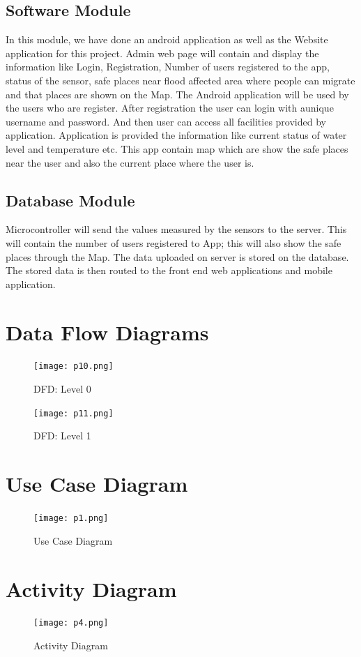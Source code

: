 \documentclass[a4paper,12pt]{report}
\begin{document}
\subsection{Software Module}
 In this module, we have done an android application as well as the Website application for this project. Admin web page will contain and display the information like Login, Registration, Number of users registered to the app, status of the sensor, safe places near flood affected area where people can migrate and that places are shown on the Map. The Android application will be used by the users who are register. After registration the user can login with aunique username and password. And then user can access all facilities provided by application. Application is provided the information like current status of water level and temperature etc. This app contain map which are show the safe places near the user and also the current place where the user is. 
\subsection{Database Module}
 Microcontroller will send the values measured by the sensors to the server. This will contain the number of users registered to App; this will also show the safe places through the Map. The data uploaded on server is stored on the database. The stored data is then routed to the front end web applications and mobile application.

\section{Data Flow Diagrams}
\begin{figure}[H]
  \texttt{[image: p10.png]}
  \caption{DFD: Level 0}
  \label{fig:boat1}
\end{figure}

\begin{figure}[H]
  \texttt{[image: p11.png]}
  \caption{DFD: Level 1}
  \label{fig:boat1}
\end{figure}

\section{Use Case Diagram}
\begin{figure}[H]
  \texttt{[image: p1.png]}
  \caption{Use Case Diagram}
  \label{fig:boat1}
\end{figure}

\section{Activity Diagram}
\begin{figure}[H]
  \texttt{[image: p4.png]}
  \caption{Activity Diagram}
  \label{fig:boat1}
\end{figure}
\end{document}
